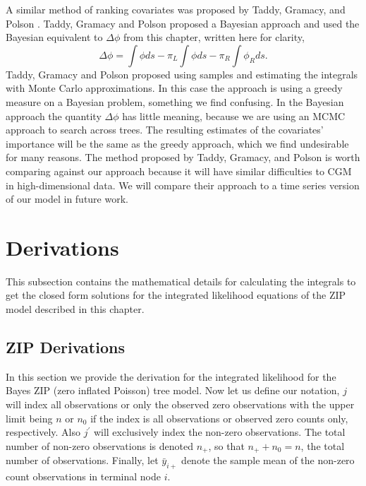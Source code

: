 A similar method of ranking covariates was proposed by Taddy, Gramacy, and Polson \cite{taddy2011dynamic}. Taddy, Gramacy and Polson proposed a Bayesian approach and used the Bayesian equivalent to $\Delta\phi$ from this chapter, written here for clarity, 
\begin{equation}
\Delta\phi = \int\phi ds - \pi_L\int\phi ds -\pi_R \int \phi_Rds. 
 \end{equation}
Taddy, Gramacy and Polson proposed using samples and estimating the integrals with Monte Carlo approximations. In this case the approach is using a greedy measure on a Bayesian problem, something we find confusing.
In the Bayesian approach the quantity $\Delta\phi$ has little meaning, because we are using an MCMC approach to search across trees. The resulting estimates of the covariates' importance will be the same as the greedy approach, which we find undesirable for many reasons. The method proposed by Taddy, Gramacy, and Polson is worth comparing against our approach because it will have similar difficulties to CGM in high-dimensional data. We will compare their approach to a time series version of our model in future work.
 

 

%

\section{Derivations}
\label{ch:p3sub_theory}

This subsection contains the mathematical details for calculating the integrals to get the closed form solutions for the integrated likelihood equations of the ZIP model described in this chapter.   


\subsection{ZIP Derivations}

In this section we provide the derivation for the integrated likelihood for the Bayes ZIP (zero inflated Poisson) tree model. Now let us define our notation, $j$ will index all observations or only the observed zero observations with the upper limit being $n$ or  $n_0$ if the index is all observations or observed zero counts only, respectively.  Also $j^{\prime}$ will exclusively index the non-zero observations. The total number of non-zero observations is denoted $n_+$, so that $n_++n_0=n$, the total number of observations. Finally, let $\bar{y}_{i+}$ denote the sample mean of the non-zero count observations in terminal node $i$. 

